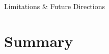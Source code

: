 \documentclass[aspectratio=169, 11pt]{beamer}
\begin{document}
\begin{frame}{Limitations \& Future Directions}
\end{frame}

\section{Summary}
\end{document}

